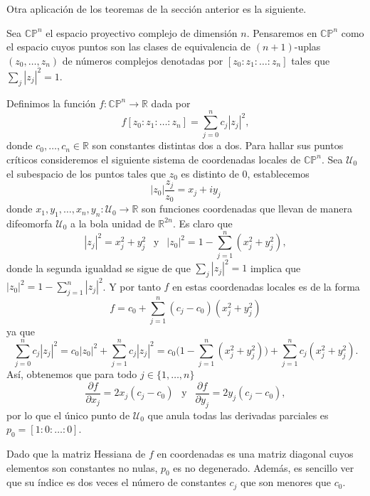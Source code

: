 Otra aplicación de los teoremas de la sección anterior es la siguiente.

Sea $\mathbb{CP}^n$ el espacio proyectivo complejo de dimensión $n$. Pensaremos en $\mathbb{CP}^n$ como el espacio cuyos puntos son las clases de equivalencia de $(n+1)$-uplas $(z_0,\dots,z_n)$ de números complejos denotadas por $[z_0:z_1:\dots:z_n]$ tales que $\sum_j |z_j|^2=1$. 

Definimos la función $f:\mathbb{CP}^n \to \mathbb{R}$ dada por 
\begin{equation*}
    f[z_0:z_1:\dots:z_n] = \sum_{j=0}^n c_j |z_j|^2,
\end{equation*}
donde $c_0,\dots,c_n\in \mathbb{R}$ son constantes distintas dos a dos. Para hallar sus puntos críticos consideremos el siguiente sistema de coordenadas locales de $\mathbb{CP}^n$. Sea $\mathcal{U}_0$ el subespacio de los puntos tales que $z_0$ es distinto de $0$, establecemos 
\begin{equation*}
    |z_0|\frac{z_j}{z_0} = x_j + iy_j
\end{equation*}
donde $x_1,y_1,\dots,x_n,y_n : \mathcal{U}_0\to \mathbb{R}$ son funciones coordenadas que llevan de manera difeomorfa $\mathcal{U}_0$ a la bola unidad de $\mathbb{R}^{2n}$. Es claro que 
\begin{equation*}
    |z_j|^2 = x_j^2 + y_j^2 ~~\text{ y }~~ |z_0|^2 = 1 - \sum_{j=1}^n (x_j^2 + y_j^2),
\end{equation*}
donde la segunda igualdad se sigue de que $\sum_j |z_j|^2=1$ implica que $|z_0|^2 = 1 - \sum_{j=1}^n |z_j|^2 $. Y por tanto $f$ en estas coordenadas locales es de la forma
\begin{equation*}
    f = c_0 + \sum_{j=1}^n (c_j-c_0)(x_j^2 + y_j^2)
\end{equation*}
ya que 
\begin{equation*}
    \sum_{j=0}^n c_j |z_j|^2 = c_0|z_0|^2 + \sum_{j=1}^n c_j |z_j|^2 = c_0 \Big(1 - \sum_{j=1}^n (x_j^2 + y_j^2) \Big) + \sum_{j=1}^n c_j(x_j^2 + y_j^2).
\end{equation*}
Así, obtenemos que para todo $j\in\{1,\dots,n\}$
\begin{equation*}
    \frac{\partial f}{\partial x_j} = 2x_j(c_j - c_0) ~~\text{ y }~~ \frac{\partial f}{\partial y_j} = 2y_j(c_j - c_0),
\end{equation*}
por lo que el único punto de $\mathcal{U}_0$ que anula todas las derivadas parciales es $p_0 = [1:0:\dots:0]$. 

Dado que la matriz Hessiana de $f$ en coordenadas es una matriz diagonal cuyos elementos son constantes no nulas, $p_0$ es no degenerado. Además, es sencillo ver que su índice es dos veces el número de constantes $c_j$ que son menores que $c_0$.

